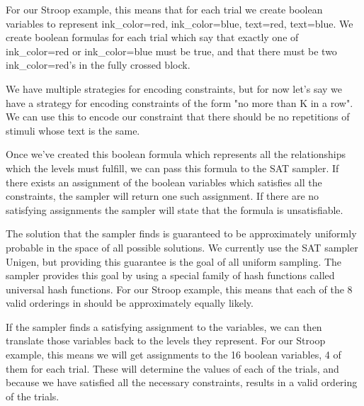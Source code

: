 For our Stroop example, this means that for each trial we create boolean variables to represent ink\_color=red, ink\_color=blue, text=red, text=blue. We create boolean formulas for each trial which say that exactly one of ink\_color=red or ink\_color=blue must be true, and that there must be two ink\_color=red's in the fully crossed block.

We have multiple strategies for encoding constraints, but for now let's say we have a strategy for encoding constraints of the form "no more than K in a row". We can use this to encode our constraint that there should be no repetitions of stimuli whose text is the same.

Once we've created this boolean formula which represents all the relationships which the levels must fulfill, we can pass this formula to the SAT sampler. If there exists an assignment of the boolean variables which satisfies all the constraints, the sampler will return one such assignment. If there are no satisfying assignments the sampler will state that the formula is unsatisfiable.

The solution that the sampler finds is guaranteed to be approximately uniformly probable in the space of all possible solutions. We currently use the SAT sampler Unigen, but providing this guarantee is the goal of all uniform sampling. The sampler provides this goal by using a special family of hash functions called universal hash functions. For our Stroop example, this means that each of the 8 valid orderings in  should be approximately equally likely.

If the sampler finds a satisfying assignment to the variables, we can then translate those variables back to the levels they represent. For our Stroop example, this means we will get assignments to the 16 boolean variables, 4 of them for each trial. These will determine the values of each of the trials, and because we have satisfied all the necessary constraints, results in a valid ordering of the trials.
